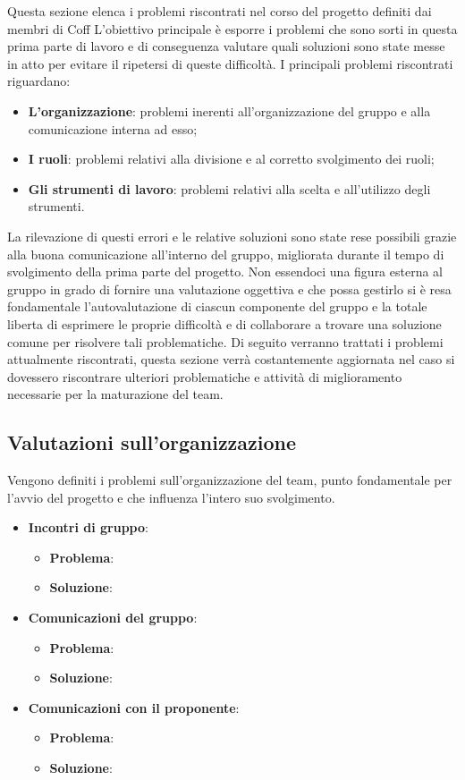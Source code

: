 \documentclass[../piano-di-qualifica.tex]{subfiles}
\begin{document}
Questa sezione elenca i problemi riscontrati nel corso del progetto definiti dai membri di Coff
L'obiettivo principale è esporre i problemi che sono sorti in questa prima parte di lavoro e di conseguenza valutare quali soluzioni sono state messe in atto per evitare il ripetersi di queste difficoltà.
I principali problemi riscontrati riguardano:
\begin{itemize}
    \item \textbf{L'organizzazione}: problemi inerenti all'organizzazione del gruppo e alla comunicazione interna ad esso;
    \item \textbf{I ruoli}: problemi relativi alla divisione e al corretto svolgimento dei ruoli;
    \item \textbf{Gli strumenti di lavoro}: problemi relativi alla scelta e all'utilizzo degli strumenti.
\end{itemize}
La rilevazione di questi errori e le relative soluzioni sono state rese possibili grazie alla buona comunicazione all'interno del gruppo, migliorata durante il tempo di svolgimento della prima parte del progetto.
Non essendoci una figura esterna al gruppo in grado di fornire una valutazione oggettiva e che possa gestirlo si è resa fondamentale l'autovalutazione di ciascun componente del gruppo e la totale liberta di esprimere le proprie difficoltà e di collaborare a trovare una soluzione comune per risolvere tali problematiche.
Di seguito verranno trattati i problemi attualmente riscontrati, questa sezione verrà costantemente aggiornata nel caso si dovessero riscontrare ulteriori problematiche e attività di miglioramento necessarie per la maturazione del team.

\subsection{Valutazioni sull’organizzazione}
\label{sub:valutazioni_organizzazione}
Vengono definiti i problemi sull'organizzazione del team, punto fondamentale per l'avvio del progetto e che influenza l'intero suo svolgimento.

\begin{itemize}
    \item \textbf{Incontri di gruppo}:
    \begin{itemize}
        \item \textbf{Problema}:
        \item \textbf{Soluzione}:
    \end{itemize}
    \item \textbf{Comunicazioni del gruppo}:
    \begin{itemize}
        \item \textbf{Problema}:
        \item \textbf{Soluzione}:
    \end{itemize}
    \item \textbf{Comunicazioni con il proponente}:
    \begin{itemize}
        \item \textbf{Problema}:
        \item \textbf{Soluzione}:
    \end{itemize}
\end{itemize}
\end{document}
